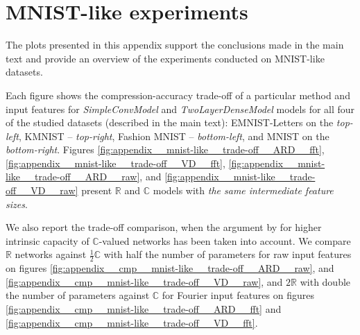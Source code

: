 \documentclass[a4paper,10pt,twocolumn]{article}
\newcommand{\real}{\mathbb{R}}
\newcommand{\cplx}{\mathbb{C}}
\begin{document}

\section{MNIST-like experiments} %
\label{sec:mnist_like_experiments}

The plots presented in this appendix support the conclusions made in the main text and
provide an overview of the experiments conducted on MNIST-like datasets.

Each figure shows the compression-accuracy trade-off of a particular method and input
features for \emph{SimpleConvModel} and \emph{TwoLayerDenseModel} models for all four
of the studied datasets (described in the main text): EMNIST-Letters on the \emph{top-left},
KMNIST -- \emph{top-right}, Fashion MNIST -- \emph{bottom-left}, and MNIST on the
\emph{bottom-right}.
%
Figures \ref{fig:appendix__mnist-like__trade-off__ARD__fft}, \ref{fig:appendix__mnist-like__trade-off__VD__fft},
\ref{fig:appendix__mnist-like__trade-off__ARD__raw}, and \ref{fig:appendix__mnist-like__trade-off__VD__raw}
present $\real$ and $\cplx$ models with \emph{the same intermediate feature sizes}.

We also report the trade-off comparison, when the argument by \citet{monning_evaluation_2018}
for higher intrinsic capacity of $\cplx$-valued networks has been taken into account.
%
We compare $\real$ networks against $\tfrac12 \cplx$ with half the number of parameters
for raw input features on figures \ref{fig:appendix__cmp__mnist-like__trade-off__ARD__raw},
and \ref{fig:appendix__cmp__mnist-like__trade-off__VD__raw}, and $2 \real$ with
double the number of parameters against $\cplx$ for Fourier input features on figures
\ref{fig:appendix__cmp__mnist-like__trade-off__ARD__fft} and
\ref{fig:appendix__cmp__mnist-like__trade-off__VD__fft}.
\end{document}
